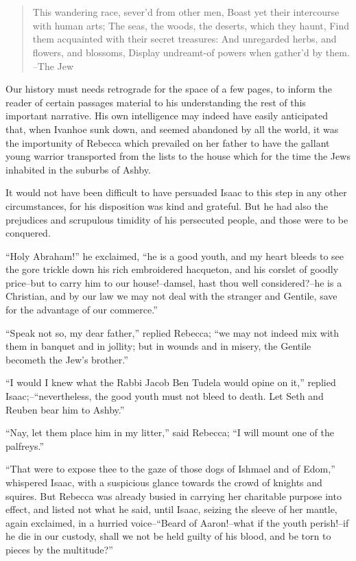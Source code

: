 \chapter{}

\begin{quote}
This wandering race, sever'd from other men,
Boast yet their intercourse with human arts;
The seas, the woods, the deserts, which they haunt,
Find them acquainted with their secret treasures:
And unregarded herbs, and flowers, and blossoms,
Display undreamt-of powers when gather'd by them.
--The Jew
\end{quote}

Our history must needs retrograde for the space of a few pages, to
inform the reader of certain passages material to his understanding the
rest of this important narrative. His own intelligence may indeed have
easily anticipated that, when Ivanhoe sunk down, and seemed abandoned by
all the world, it was the importunity of Rebecca which prevailed on her
father to have the gallant young warrior transported from the lists to
the house which for the time the Jews inhabited in the suburbs of Ashby.

It would not have been difficult to have persuaded Isaac to this step in
any other circumstances, for his disposition was kind and grateful. But
he had also the prejudices and scrupulous timidity of his persecuted
people, and those were to be conquered.

``Holy Abraham!'' he exclaimed, ``he is a good youth, and my heart
bleeds to see the gore trickle down his rich embroidered hacqueton, and
his corslet of goodly price--but to carry him to our house!--damsel,
hast thou well considered?--he is a Christian, and by our law we may not
deal with the stranger and Gentile, save for the advantage of our
commerce.''

``Speak not so, my dear father,'' replied Rebecca; ``we may not indeed
mix with them in banquet and in jollity; but in wounds and in misery,
the Gentile becometh the Jew's brother.''

``I would I knew what the Rabbi Jacob Ben Tudela would opine on it,''
replied Isaac;--``nevertheless, the good youth must not bleed to death.
Let Seth and Reuben bear him to Ashby.''

``Nay, let them place him in my litter,'' said Rebecca; ``I will mount
one of the palfreys.''

``That were to expose thee to the gaze of those dogs of Ishmael and of
Edom,'' whispered Isaac, with a suspicious glance towards the crowd of
knights and squires. But Rebecca was already busied in carrying her
charitable purpose into effect, and listed not what he said, until
Isaac, seizing the sleeve of her mantle, again exclaimed, in a hurried
voice--``Beard of Aaron!--what if the youth perish!--if he die in our
custody, shall we not be held guilty of his blood, and be torn to pieces
by the multitude?''


